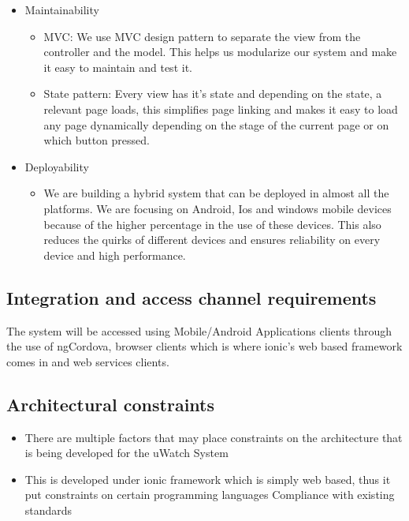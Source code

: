 \documentclass[a4paper,12pt]{article}
\begin{document}
\begin{itemize}
\item Maintainability
	\begin{itemize}
		\item MVC: We use MVC design pattern to separate the view from the controller and the model. This helps us modularize our system and make it easy to maintain and test it. 
		\item State pattern: Every view has it's state and depending on the state, a relevant page loads, this simplifies page linking and makes it easy to load any page dynamically depending on the stage of the current page or on which button pressed.   
	\end{itemize}
\item Deployability
	\begin{itemize}
		\item We are building a hybrid system that can be deployed in almost all the platforms. We are focusing on Android, Ios and windows mobile devices because of the higher percentage in the use of these devices. This also reduces the quirks of different devices and ensures reliability on every device and high performance.  
	\end{itemize}
\end{itemize}
\subsection{Integration and access channel requirements}
The system will be accessed using Mobile/Android Applications clients through the use of ngCordova,  browser clients which is where ionic's web based framework comes in and web services clients.
\subsection{Architectural constraints}
\begin{itemize}
\item There are multiple factors that may place constraints on the architecture that
is being developed for the uWatch System

\item This is developed under ionic framework which is simply web based, thus it put constraints on certain programming languages Compliance with existing standards
\end{itemize}
\end{document}
